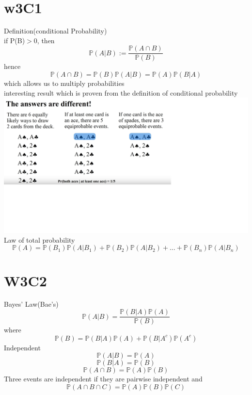 \documentclass{article}
\begin{document}
\section{w3C1}
Definition(conditional Probability)\\
if P(B)$>$0, then
$$
\mathbb{P}(A|B):=\frac{\mathbb{P}{(A \cap B)}}{\mathbb{P}(B)}
$$
hence
$$
\mathbb{P}(A \cap B)=\mathbb{P}(B)\mathbb{P}(A|B)=\mathbb{P}(A)\mathbb{P}(B|A)
$$
which allows us to multiply probabilities \\
interesting result which is proven from the definition of conditional probability\\
\includegraphics[width=\textwidth]{different}
Law of total probability
$$
\mathbb{P}(A)=\mathbb{P}(B_1)\mathbb{P}(A|B_1)+\mathbb{P}(B_2)\mathbb{P}(A|B_2)+...+\mathbb{P}(B_n)\mathbb{P}(A|B_n)
$$
\section {W3C2}
Bayes' Law(Bae's)
$$
\mathbb{P}(A|B)=\frac{\mathbb{P}{(B|A)}\mathbb{P}{(A)}}{\mathbb{P}(B)}
$$
where
$$
\mathbb{P}{(B)}=\mathbb{P}(B|A)\mathbb{P}(A)+\mathbb{P}(B|A^c)\mathbb{P}(A^c)$$
Independent
$$
\mathbb{P}(A|B)=\mathbb P (A)
$$
$$
\mathbb P (B|A)=\mathbb P (B)
$$
$$
\mathbb P (A\cap B)=\mathbb P (A) \mathbb P (B)
$$
Three events are independent if they are pairwise independent and
$$
\mathbb P (A\cap B \cap C)=\mathbb P(A)\mathbb P(B) \mathbb P(C)
$$
\end{document}
